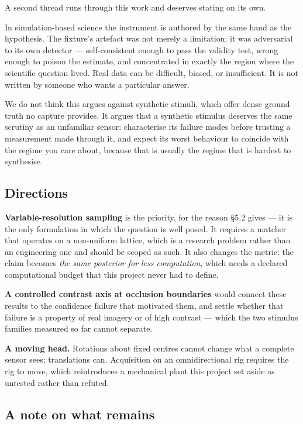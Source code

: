 A second thread runs through this work and deserves stating on its own.

In simulation-based science the instrument is authored by the same hand as the
hypothesis. The fixture's artefact was not merely a limitation; it was
adversarial to its own detector --- self-consistent enough to pass the validity
test, wrong enough to poison the estimate, and concentrated in exactly the
region where the scientific question lived. Real data can be difficult, biased,
or insufficient. It is not written by someone who wants a particular answer.

We do not think this argues against synthetic stimuli, which offer dense ground
truth no capture provides. It argues that a synthetic stimulus deserves the same
scrutiny as an unfamiliar sensor: characterise its failure modes before trusting
a measurement made through it, and expect its worst behaviour to coincide with
the regime you care about, because that is usually the regime that is hardest to
synthesise.

\subsection{Directions}

\textbf{Variable-resolution sampling} is the priority, for the reason \S5.2
gives --- it is the only formulation in which the question is well posed. It
requires a matcher that operates on a non-uniform lattice, which is a research
problem rather than an engineering one and should be scoped as such. It also
changes the metric: the claim becomes \emph{the same posterior for less
computation}, which needs a declared computational budget that this project
never had to define.

\textbf{A controlled contrast axis at occlusion boundaries} would connect these
results to the confidence failure that motivated them, and settle whether that
failure is a property of real imagery or of high contrast --- which the two
stimulus families measured so far cannot separate.

\textbf{A moving head.} Rotations about fixed centres cannot change what a
complete sensor sees; translations can. Acquisition on an omnidirectional rig
requires the rig to move, which reintroduces a mechanical plant this project set
aside as untested rather than refuted.

\subsection{A note on what remains}

